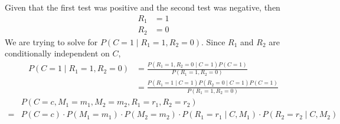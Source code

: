 \begin{enumerate}
        Given that the first test was positive and the second test was negative, then
        \begin{align*}
          R_1 & =1 \\
          R_2 & =0
        \end{align*}
        We are trying to solve for $P(C=1\mid R_1=1, R_2=0)$. Since $R_1$ and $R_2$ are conditionally independent on $C$,
        \begin{align*}
          P(C=1\mid R_1=1, R_2=0) & =\frac{P(R_1=1, R_2=0\mid C=1)P(C=1)}{P(R_1=1, R_2=0)}          \\[5pt]
                                  & =\frac{P(R_1=1\mid C=1)P(R_2=0\mid C=1)P(C=1)}{P(R_1=1, R_2=0)}
        \end{align*}
        \begin{align*}
            & P(C=c, M_1=m_1, M_2=m_2, R_1=r_1, R_2=r_2)                                                      \\
          = & P(C=c)\cdot P(M_1=m_1) \cdot P(M_2=m_2) \cdot P(R_1=r_1\mid C, M_1) \cdot P(R_2=r_2\mid C, M_2)
        \end{align*}
\end{enumerate}

\clearpage